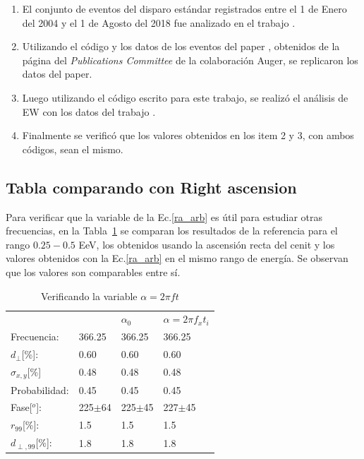 \documentclass[11pt,papel,oneside,singlespace]{ibtesis}
\begin{document}
\begin{enumerate}
    \item El conjunto de eventos del disparo estándar registrados entre el 1 de Enero del 2004 y el 1 de Agosto del 2018 fue analizado en el trabajo \cite{Aab_2020}.
    \item Utilizando el código y los datos de los eventos del paper \cite{Aab_2020}, obtenidos de la página del \emph{Publications Committee} de la colaboración Auger, se replicaron los datos del paper. 
    \item Luego utilizando el código escrito para este trabajo, se realizó el análisis de EW con los datos del trabajo \cite{Aab_2020}. 
    \item Finalmente se verificó que los valores obtenidos en los item 2 y 3, con  ambos códigos, sean el mismo.
\end{enumerate}

\subsection{Tabla comparando con Right ascension}

Para verificar que la variable de la Ec.\ref{ra_arb} es útil para estudiar otras frecuencias, en la Tabla~\ref{tab:comp_vars} se comparan los resultados de la referencia para el rango $0.25-0.5$ EeV, los obtenidos usando la ascensión recta del cenit y los valores obtenidos con la Ec.\ref{ra_arb} en el mismo rango de energía. Se observan que los valores son comparables entre sí.


\begin{table}[H]
    \begin{small}
        \begin{center}
            \begin{tabular}[c]{l|l|l|l}
                                    & \cite{Aab_2020} & $\alpha_0$   & $\alpha=2\pi f_xt_i$   \\ 
                Frecuencia:         & 366.25          &  366.25      &  366.25            \\
                $d_\perp$[\%]:      & 0.60            &  0.60        &  0.60              \\
                $\sigma_{x,y}$[\%]  & 0.48            &  0.48        &  0.48              \\ 
                Probabilidad:       & 0.45            &  0.45        &  0.45              \\
                Fase[$^o$]:         & 225$\pm$64\cite{discrepancia} & 225$\pm$45   &  227$\pm$45          \\
                $r_{99}$[\%]:       & 1.5             &  1.5       &  1.5             \\
                $d_{\perp,99}$[\%]: & 1.8             &  1.8       &  1.8             \\
            \end{tabular}
        \end{center}
        \caption{Verificando la  variable $\alpha=2\pi ft$}
        \label{tab:comp_vars}
    \end{small}
\end{table}
\end{document}
